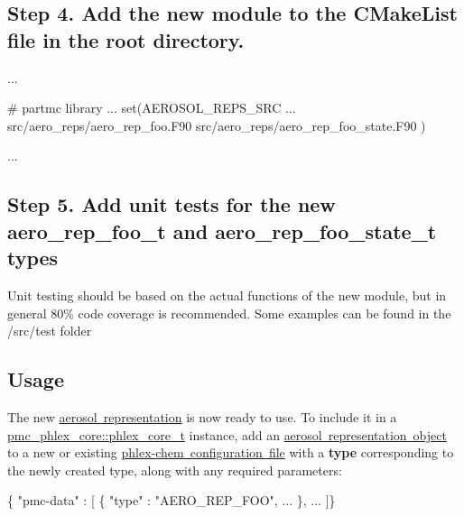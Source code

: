 \subsection*{Step 4. Add the new module to the C\+Make\+List file in the root directory.}


\begin{DoxyCode}
...

# partmc library
...
set(AEROSOL\_REPS\_SRC
  ...
  src/aero\_reps/aero\_rep\_foo.F90
  src/aero\_reps/aero\_rep\_foo\_state.F90
)

...
\end{DoxyCode}


\subsection*{Step 5. Add unit tests for the new {\ttfamily aero\+\_\+rep\+\_\+foo\+\_\+t} and {\ttfamily aero\+\_\+rep\+\_\+foo\+\_\+state\+\_\+t} types}

Unit testing should be based on the actual functions of the new module, but in general 80\% code coverage is recommended. Some examples can be found in the {\ttfamily /src/test} folder

\subsection*{Usage}

The new \mbox{\hyperlink{phlex_aero_rep}{aerosol representation}} is now ready to use. To include it in a {\ttfamily \mbox{\hyperlink{structpmc__phlex__core_1_1phlex__core__t}{pmc\+\_\+phlex\+\_\+core\+::phlex\+\_\+core\+\_\+t}}} instance, add an \mbox{\hyperlink{input_format_aero_rep}{aerosol representation object}} to a new or existing \mbox{\hyperlink{input_format_phlex_config}{phlex-\/chem configuration file}} with a {\bfseries type} corresponding to the newly created type, along with any required parameters\+:


\begin{DoxyCode}
\{ "pmc-data" : [
  \{
    "type" : "AERO\_REP\_FOO",
    ...
  \},
  ...
]\}
\end{DoxyCode}
 